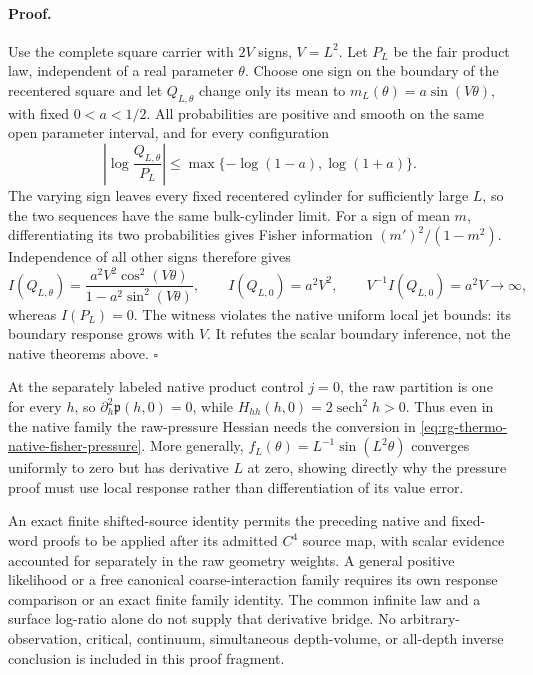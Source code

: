 \paragraph{Proof.}
Use the complete square carrier with \(2V\) signs, \(V=L^2\). Let
\(P_L\) be the fair product law, independent of a real parameter
\(\theta\). Choose one sign on the boundary of the recentered square
and let \(Q_{L,\theta}\) change only its mean to
\(m_L(\theta)=a\sin(V\theta)\), with fixed \(0<a<1/2\).
All probabilities are positive and smooth on the same open parameter
interval, and for every configuration
\begin{equation}
 \left|\log\frac{Q_{L,\theta}}{P_L}\right|
 \le\max\{-\log(1-a),\log(1+a)\}.
 \label{eq:rg-thermo-native-boundary-ratio-control}
\end{equation}
The varying sign leaves every fixed recentered cylinder for sufficiently
large \(L\), so the two sequences have the same bulk-cylinder limit.
For a sign of mean \(m\), differentiating its two probabilities gives
Fisher information \((m')^2/(1-m^2)\). Independence of all other signs
therefore gives
\begin{equation}
 I(Q_{L,\theta})=
   \frac{a^2V^2\cos^2(V\theta)}{1-a^2\sin^2(V\theta)},
 \qquad I(Q_{L,0})=a^2V^2,
 \qquad V^{-1}I(Q_{L,0})=a^2V\longrightarrow\infty,
 \label{eq:rg-thermo-native-boundary-score-growth}
\end{equation}
whereas \(I(P_L)=0\). The witness violates the native uniform local jet
bounds: its boundary response grows with \(V\). It refutes the scalar
boundary inference, not the native theorems above. \hfill\(\square\)

At the separately labeled native product control \(j=0\), the raw
partition is one for every \(h\), so
\(\partial_h^2\mathfrak p(h,0)=0\), while
\(H_{hh}(h,0)=2\operatorname{sech}^2h>0\). Thus even in the native
family the raw-pressure Hessian needs the conversion in
\cref{eq:rg-thermo-native-fisher-pressure}. More generally,
\(f_L(\theta)=L^{-1}\sin(L^2\theta)\) converges uniformly to zero but
has derivative \(L\) at zero, showing directly why the pressure proof
must use local response rather than differentiation of its value error.\thermoestablishedstatus


An exact finite shifted-source identity permits the preceding native and
fixed-word proofs to be applied after its admitted \(C^4\) source map,
with scalar evidence accounted for separately in the raw geometry weights.
A general positive likelihood or a free canonical coarse-interaction
family requires its own response comparison or an exact finite family
identity. The common infinite law and a surface log-ratio alone do not
supply that derivative bridge. No arbitrary-observation, critical,
continuum, simultaneous depth-volume, or all-depth inverse conclusion is
included in this proof fragment.\thermoestablishedstatus

